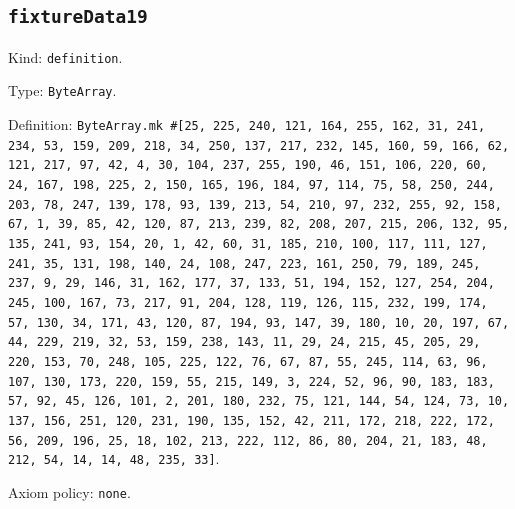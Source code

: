 \documentclass[11pt]{article}
\begin{document}
\subsection*{\texttt{fixtureData19}}
\noindent Kind: \texttt{definition}.\par
\noindent Type: \texttt{ByteArray}.\par
\noindent Definition: \texttt{ByteArray.mk \#[25, 225, 240, 121, 164, 255, 162, 31, 241, 234, 53, 159, 209, 218, 34, 250, 137, 217, 232, 145, 160, 59, 166, 62, 121, 217, 97, 42, 4, 30, 104, 237, 255, 190, 46, 151, 106, 220, 60, 24, 167, 198, 225, 2, 150, 165, 196, 184, 97, 114, 75, 58, 250, 244, 203, 78, 247, 139, 178, 93, 139, 213, 54, 210, 97, 232, 255, 92, 158, 67, 1, 39, 85, 42, 120, 87, 213, 239, 82, 208, 207, 215, 206, 132, 95, 135, 241, 93, 154, 20, 1, 42, 60, 31, 185, 210, 100, 117, 111, 127, 241, 35, 131, 198, 140, 24, 108, 247, 223, 161, 250, 79, 189, 245, 237, 9, 29, 146, 31, 162, 177, 37, 133, 51, 194, 152, 127, 254, 204, 245, 100, 167, 73, 217, 91, 204, 128, 119, 126, 115, 232, 199, 174, 57, 130, 34, 171, 43, 120, 87, 194, 93, 147, 39, 180, 10, 20, 197, 67, 44, 229, 219, 32, 53, 159, 238, 143, 11, 29, 24, 215, 45, 205, 29, 220, 153, 70, 248, 105, 225, 122, 76, 67, 87, 55, 245, 114, 63, 96, 107, 130, 173, 220, 159, 55, 215, 149, 3, 224, 52, 96, 90, 183, 183, 57, 92, 45, 126, 101, 2, 201, 180, 232, 75, 121, 144, 54, 124, 73, 10, 137, 156, 251, 120, 231, 190, 135, 152, 42, 211, 172, 218, 222, 172, 56, 209, 196, 25, 18, 102, 213, 222, 112, 86, 80, 204, 21, 183, 48, 212, 54, 14, 14, 48, 235, 33]}.\par
\noindent Axiom policy: \texttt{none}.\par
\end{document}

